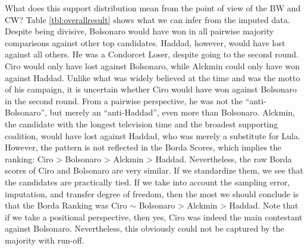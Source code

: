 \documentclass[hidelinks,11pt]{article}
\begin{document}
What does this support distribution mean from the point of view of the BW and
CW? Table \ref{tbl:overallresult} shows what we can infer from the imputed data.
Despite being divisive, Bolsonaro would have won in all pairwise majority
comparisons against other top candidates. Haddad, however, would have lost
against all others. He was a Condorcet Loser, despite going to the second round.
Ciro would only have lost against Bolsonaro, while Alckmin could only have won
against Haddad. Unlike what was widely believed at the time and was the motto of
his campaign, it is uncertain whether Ciro would have won against Bolsonaro in
the second round. From a pairwise perspective, he was not the
``anti-Bolsonaro'', but merely an ``anti-Haddad'', even more than Bolsonaro.
Alckmin, the candidate with the longest television time and the broadest
supporting coalition, would have lost against Haddad, who was merely a
substitute for Lula. However, the pattern is not reflected in the Borda Scores,
which implies the ranking: Ciro > Bolsonaro > Alckmin > Haddad. Nevertheless,
the raw Borda scores of Ciro and Bolsonaro are very similar. If we standardize
them, we see that the candidates are practically tied. If we take into account
the sampling error, imputation, and transfer degree of freedom, then the most we
should conclude is that the Borda Ranking was Ciro \(\sim\) Bolsonaro > Alckmin
> Haddad. Note that if we take a positional perspective, then yes, Ciro was
indeed the main contestant against Bolsonaro. Nevertheless, this obviously could
not be captured by the majority with run-off.
\end{document}
